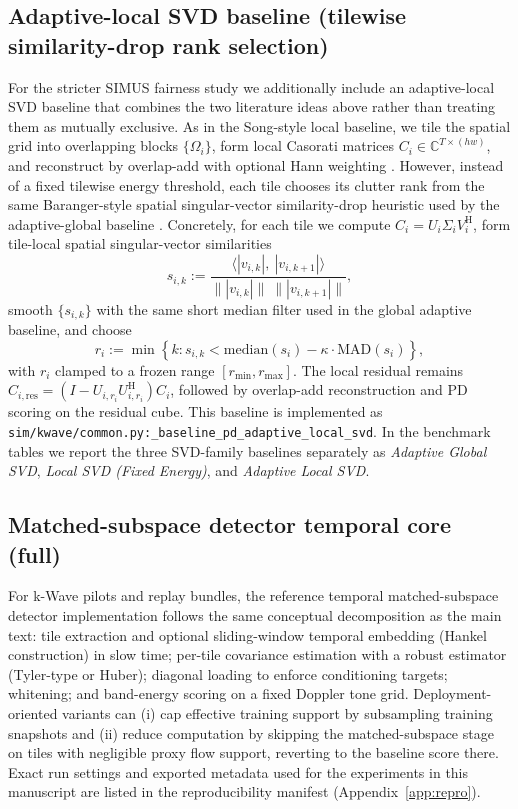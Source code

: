 \documentclass[11pt]{article}
\DeclareRobustCommand{\path}[1]{\nolinkurl{#1}}
\newcommand{\Hh}{^{\mathrm{H}}}
\newif\ifPAPERONLY
\newcommand{\SuppOrApp}[1]{\ifPAPERONLY Supplementary Material\else Appendix~\ref{#1}\fi}
\begin{document}
\subsection{Adaptive-local SVD baseline (tilewise similarity-drop rank selection)}
\label{app:baseline-adaptive-local-svd}
For the stricter SIMUS fairness study we additionally include an adaptive-local SVD baseline that combines the two literature ideas above rather than treating them as mutually exclusive. As in the Song-style local baseline, we tile the spatial grid into overlapping blocks $\{\Omega_i\}$, form local Casorati matrices $C_i\in\mathbb{C}^{T\times(hw)}$, and reconstruct by overlap-add with optional Hann weighting \cite{SongBlockwiseLocal2017}. However, instead of a fixed tilewise energy threshold, each tile chooses its clutter rank from the same Baranger-style spatial singular-vector similarity-drop heuristic used by the adaptive-global baseline \cite{BarangerAdaptiveSVD2018}. Concretely, for each tile we compute $C_i=U_i\Sigma_iV_i\Hh$, form tile-local spatial singular-vector similarities
\[
  s_{i,k} := \frac{\langle |v_{i,k}|,\ |v_{i,k+1}|\rangle}{\| |v_{i,k}|\|\ \| |v_{i,k+1}|\|},
\]
smooth $\{s_{i,k}\}$ with the same short median filter used in the global adaptive baseline, and choose
\[
  r_i := \min \left\{k : s_{i,k} < \mathrm{median}(s_i) - \kappa\cdot \mathrm{MAD}(s_i)\right\},
\]
with $r_i$ clamped to a frozen range $[r_{\min}, r_{\max}]$. The local residual remains $C_{i,\mathrm{res}}=(I-U_{i,r_i}U_{i,r_i}\Hh)C_i$, followed by overlap-add reconstruction and PD scoring on the residual cube. This baseline is implemented as \path{sim/kwave/common.py:_baseline_pd_adaptive_local_svd}. In the benchmark tables we report the three SVD-family baselines separately as \emph{Adaptive Global SVD}, \emph{Local SVD (Fixed Energy)}, and \emph{Adaptive Local SVD}.

\subsection{Matched-subspace detector temporal core (full)}
For k-Wave pilots and replay bundles, the reference temporal matched-subspace detector implementation follows the same conceptual decomposition as the main text: tile extraction and optional sliding-window temporal embedding (Hankel construction) in slow time; per-tile covariance estimation with a robust estimator (Tyler-type or Huber); diagonal loading to enforce conditioning targets; whitening; and band-energy scoring on a fixed Doppler tone grid. Deployment-oriented variants can (i) cap effective training support by subsampling training snapshots and (ii) reduce computation by skipping the matched-subspace stage on tiles with negligible proxy flow support, reverting to the baseline score there. Exact run settings and exported metadata used for the experiments in this manuscript are listed in the reproducibility manifest (\SuppOrApp{app:repro}).
\end{document}
